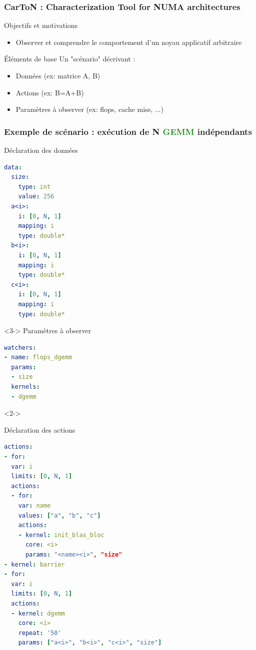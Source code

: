 \documentclass[xcolor={usenames,dvipsnames,svgnames,table}, aspectratio=43]{beamer}
\newcommand{\gemmcolor}[1]{\textcolor{ForestGreen}{\textbf{#1}}\xspace}
\newcommand{\gemm}{\gemmcolor{GEMM}}
\begin{document}
\begin{frame}
  \frametitle{CarToN : Characterization Tool for NUMA architectures}

  \begin{block}{Objectifs et motivations}
    \begin{itemize}
      \item Observer et comprendre le comportement d'un noyau applicatif arbitraire
    \end{itemize}
  \end{block}

  \begin{block}{Éléments de base}
    Un "scénario" décrivant :
    \begin{itemize}
      \item Données (ex: matrice A, B)
      \item Actions (ex: B=A+B)
      \item Paramètres à observer (ex: flops, cache miss, ...)
    \end{itemize}
  \end{block}
\end{frame}

\begin{frame}[fragile]
\frametitle{Exemple de scénario : exécution de N \gemm indépendants}

\hspace{0.1cm}
\begin{minipage}[t]{0.38\linewidth}
  Déclaration des données
  \begin{lstlisting}[language=yaml]
data:
  size:
    type: int
    value: 256
  a<i>:
    i: [0, N, 1]
    mapping: i
    type: double*
  b<i>:
    i: [0, N, 1]
    mapping: i
    type: double*
  c<i>:
    i: [0, N, 1]
    mapping: i
    type: double*
  \end{lstlisting}
\begin{uncoverenv}<3->
  Paramètres à observer
  \begin{lstlisting}[language=yaml]
watchers:
- name: flops_dgemm
  params:
  - size
  kernels:
  - dgemm
  \end{lstlisting}
\end{uncoverenv}
\end{minipage}
\hspace{0.3cm}
\begin{uncoverenv}<2->
\begin{minipage}[t]{0.54\linewidth}
  Déclaration des actions
  \begin{lstlisting}[language=yaml]
actions:
- for:
  var: i
  limits: [0, N, 1]
  actions:
  - for:
    var: name
    values: ["a", "b", "c"]
    actions:
    - kernel: init_blas_bloc
      core: <i>
      params: "<name><i>", "size"
- kernel: barrier
- for:
  var: i
  limits: [0, N, 1]
  actions:
  - kernel: dgemm
    core: <i>
    repeat: '50'
    params: ["a<i>", "b<i>", "c<i>", "size"]
  \end{lstlisting}
\end{minipage}
\end{uncoverenv}

\end{frame}
\end{document}
